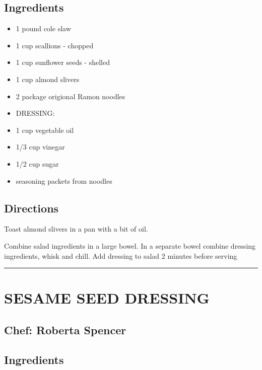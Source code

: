 \documentclass[
]{book}
\providecommand{\tightlist}{%
  \setlength{\itemsep}{0pt}\setlength{\parskip}{0pt}}
\begin{document}
\hypertarget{ingredients-22}{%
\subsection*{Ingredients}\label{ingredients-22}}


\begin{itemize}
\tightlist
\item
  1 pound cole slaw
\item
  1 cup scallions - chopped
\item
  1 cup sunflower seeds - shelled
\item
  1 cup almond slivers
\item
  2 package origional Ramon noodles
\item
  DRESSING:
\item
  1 cup vegetable oil
\item
  1/3 cup vinegar
\item
  1/2 cup sugar
\item
  seasoning packets from noodles
\end{itemize}

\hypertarget{directions-22}{%
\subsection*{Directions}\label{directions-22}}


Toast almond slivers in a pan with a bit of oil.

Combine salad ingredients in a large bowel. In a separate bowel combine dressing ingredients, whisk and chill. Add dressing to salad 2 minutes before serving

\begin{center}\rule{0.5\linewidth}{0.5pt}\end{center}

\hypertarget{sesame-seed-dressing}{%
\section*{SESAME SEED DRESSING}\label{sesame-seed-dressing}}


\hypertarget{chef-roberta-spencer-4}{%
\subsection*{Chef: Roberta Spencer}\label{chef-roberta-spencer-4}}


\hypertarget{ingredients-23}{%
\subsection*{Ingredients}\label{ingredients-23}}
\end{document}
